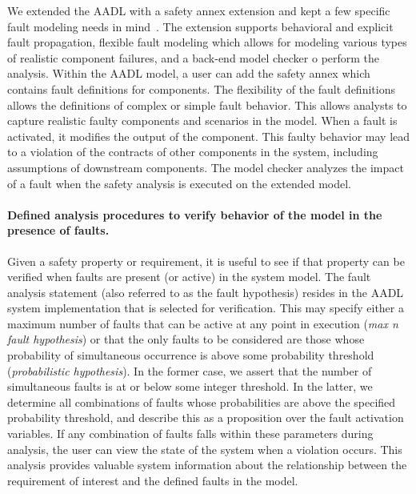 We extended the AADL with a safety annex extension and kept a few specific fault modeling needs in mind~\cite{Stewart17:IMBSA}. The extension supports behavioral and explicit fault propagation, flexible fault modeling which allows for modeling various types of realistic component failures, and a back-end model checker o perform the analysis.  Within the AADL model, a user can add the safety annex which contains fault definitions for components. The flexibility of the fault definitions allows the definitions of complex or simple fault behavior. This allows analysts to capture realistic faulty components and scenarios in the model. When a fault is activated, it modifies the output of the component. This faulty behavior may lead to a violation of the contracts of other components in the system, including assumptions of downstream components. The model checker analyzes the impact of a fault when the safety analysis is executed on the extended model.

\paragraph{Defined analysis procedures to verify behavior of the model in the presence of faults.}
Given a safety property or requirement, it is useful to see if that property can be verified when faults are present (or active) in the system model. The fault analysis statement (also referred to as the fault hypothesis) resides in the AADL system implementation that is selected for verification. This may specify either a maximum number of faults that can be active at any point in execution (\emph{max n fault hypothesis}) or that the only faults to be considered are those whose probability of simultaneous occurrence is above some probability threshold (\emph{probabilistic hypothesis}).  In the former case, we assert that the number of simultaneous faults is at or below some integer threshold.  In the latter, we determine all combinations of faults whose probabilities are above the specified probability threshold, and describe this as a proposition over the fault activation variables. If any combination of faults falls within these parameters during analysis, the user can view the state of the system when a violation occurs. This analysis provides valuable system information about the relationship between the requirement of interest and the defined faults in the model. 

